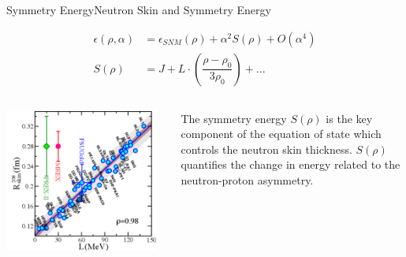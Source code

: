 \documentclass[9pt,a4paper]{beamer}
\begin{document}
\begin{frame}{Symmetry Energy}{Neutron Skin and Symmetry Energy}

\begin{equation}
\begin{split}
\epsilon(\rho, \alpha) &= \epsilon_{SNM}(\rho) + \alpha^{2} S(\rho) + O(\alpha^{4}) \\
S(\rho) &= J + L \cdot (\dfrac{\rho - \rho_{0}}{3 \rho_{0}}) + ...
\end{split}
\end{equation} 

\begin{columns}[T]
\begin{column}{0.5\textwidth}
\begin{center}
\includegraphics[width = 0.95\textwidth]{figures/LvsR1.pdf}
\end{center}
\end{column}
\begin{column}{0.5\textwidth}
 \medskip The symmetry energy $S(\rho)$ is the key component of the equation of state which controls the neutron skin thickness. $S(\rho)$ quantifies the change in energy related to the neutron-proton asymmetry. 
\end{column}
\end{columns}


\end{frame}
\end{document}
